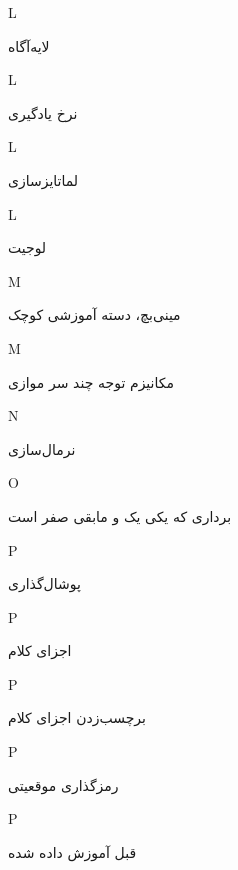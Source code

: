 \begin{center}
L
\end{center}
	 \dotfill 	لایه‌آگاه \\ 
\begin{center}
L
\end{center}
	 \dotfill 	 نرخ یادگیری \\ 
\begin{center}
L
\end{center}
	 \dotfill 	لماتایز‌سازی \\ 
\begin{center}
L
\end{center}
	 \dotfill 	لوجیت \\ 
\begin{center}
M
\end{center}
	 \dotfill 	مینی‌بچ، دسته آموزشی کوچک \\ 
\begin{center}
M
\end{center}
	 \dotfill 	مکانیزم توجه چند سر موازی \\ 
\begin{center}
N
\end{center}
	 \dotfill 	نرمال‌سازی \\ 
\begin{center}
O
\end{center}
	 \dotfill 	برداری که یکی یک و مابقی صفر است \\ 
\begin{center}
P
\end{center}
	 \dotfill 	پوشال‌گذاری \\ 
\begin{center}
P
\end{center}
	 \dotfill 	اجزای کلام \\ 
\begin{center}
P
\end{center}
	 \dotfill 	برچسب‌زدن اجزای کلام \\ 
\begin{center}
P
\end{center}
	 \dotfill 	رمزگذاری موقعیتی \\ 
\begin{center}
P
\end{center}
	 \dotfill 	 قبل آموزش داده‌ شده \\ 
